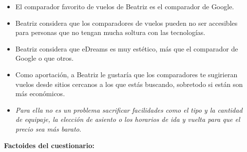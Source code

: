 \begin{itemize}
    \item El comparador favorito de vuelos de Beatriz es el comparador de Google.
    \item Beatriz considera que los comparadores de vuelos pueden no ser accesibles para personas que no tengan mucha soltura con las tecnologías.
    \item Beatriz considera que eDreams es muy estético, más que el comparador de Google o que otros.
    \item Como aportación, a Beatriz le gustaría que los comparadores te sugirieran vuelos desde sitios cercanos a los que estás buscando, sobretodo si están son más económicos.
    \item \textit{Para ella no es un problema sacrificar facilidades como el tipo y la cantidad de equipaje, la elección de asiento o los horarios de ida y vuelta para que el precio sea más barato}.
\end{itemize}


\textbf{Factoides del cuestionario:}

